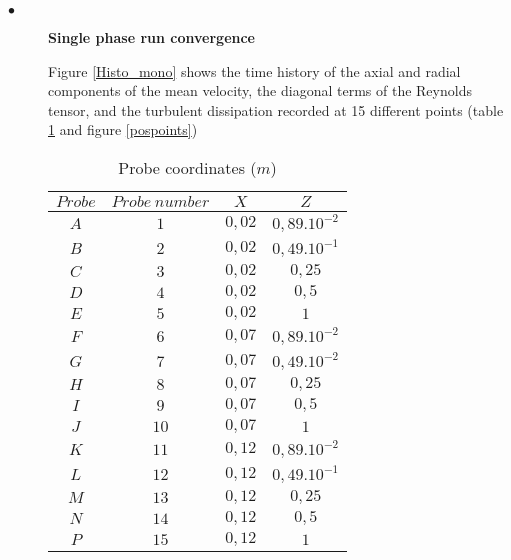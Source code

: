 \begin{description}
   \item[$\bullet$]\textbf{Single phase run convergence}

         Figure \ref{Histo_mono} shows the time history of the axial and radial components of the mean velocity, the diagonal terms of the Reynolds tensor, and the turbulent dissipation recorded at 15 different points (table \ref{tab_capteur} and figure \ref{pospoints})

         \begin{table}[H]
            \begin{center}
               \begin{tabular}{|c|c|c|c|}
                  \hline
                  $Probe$ & $Probe~number$ & $X$ & $Z$ \\
                  \hline
                  $A$ & $1$ & $0,02$ & $0,89.10^{-2}$ \\
                  \hline
                  $B$ & $2$ & $0,02$ & $0,49.10^{-1}$ \\
                  \hline
                  $C$ & $3$ & $0,02$ & $0,25$         \\
                  \hline
                  $D$ & $4$ & $0,02$ & $0,5$          \\
                  \hline
                  $E$ & $5$ & $0,02$ & $1$            \\
                  \hline
                  $F$ & $6$ & $0,07$ & $0,89.10^{-2}$ \\
                  \hline
                  $G$ & $7$ & $0,07$ & $0,49.10^{-2}$ \\
                  \hline
                  $H$ & $8$ & $0,07$ & $0,25$         \\
                  \hline
                  $I$ & $9$ & $0,07$ & $0,5$          \\
                  \hline
                  $J$ & $10$ & $0,07$ & $1$            \\
                  \hline
                  $K$ & $11$ & $0,12$ & $0,89.10^{-2}$ \\
                  \hline
                  $L$ & $12$ & $0,12$ & $0,49.10^{-1}$ \\
                  \hline
                  $M$ & $13$ & $0,12$ & $0,25$         \\
                  \hline
                  $N$ & $14$ & $0,12$ & $0,5$          \\
                  \hline
                  $P$ & $15$ & $0,12$ & $1$            \\
                  \hline
               \end{tabular}
               \caption{Probe coordinates ($m$)}
               \label{tab_capteur}
            \end{center}
         \end{table}


\end{description}
